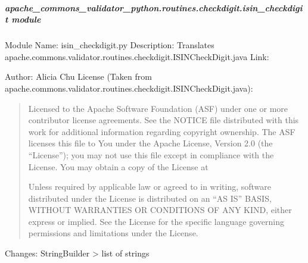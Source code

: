 \documentclass[letterpaper,10pt,english]{sphinxmanual}
\begin{document}
\subparagraph{apache\_commons\_validator\_python.routines.checkdigit.isin\_checkdigit module}
\label{\detokenize{apache_commons_validator_python.routines.checkdigit:module-apache_commons_validator_python.routines.checkdigit.isin_checkdigit}}\label{\detokenize{apache_commons_validator_python.routines.checkdigit:apache-commons-validator-python-routines-checkdigit-isin-checkdigit-module}}
\sphinxAtStartPar
Module Name: isin\_checkdigit.py
Description: Translates apache.commons.validator.routines.checkdigit.ISINCheckDigit.java
Link: 

\sphinxAtStartPar
Author: Alicia Chu
License (Taken from apache.commons.validator.routines.checkdigit.ISINCheckDigit.java):
\begin{quote}

\sphinxAtStartPar
Licensed to the Apache Software Foundation (ASF) under one or more
contributor license agreements. See the NOTICE file distributed with
this work for additional information regarding copyright ownership.
The ASF licenses this file to You under the Apache License, Version 2.0
(the “License”); you may not use this file except in compliance with
the License. You may obtain a copy of the License at
\begin{quote}

\sphinxAtStartPar
{}
\end{quote}

\sphinxAtStartPar
Unless required by applicable law or agreed to in writing, software
distributed under the License is distributed on an “AS IS” BASIS,
WITHOUT WARRANTIES OR CONDITIONS OF ANY KIND, either express or implied.
See the License for the specific language governing permissions and
limitations under the License.
\end{quote}

\sphinxAtStartPar
Changes:
\sphinxhyphen{} StringBuilder \sphinxhyphen{}\textgreater{} list of strings
\end{document}
